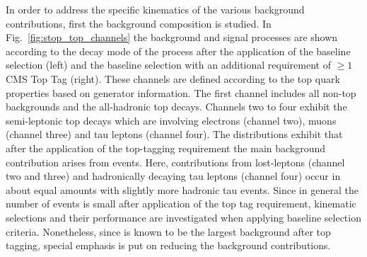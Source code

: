 In order to address the specific kinematics of the various background contributions, first the background composition is studied. In Fig.~\ref{fig:stop_top_channels} the background and signal processes are shown according to the decay mode of the process after the application of the baseline selection (left) and the baseline selection with an additional requirement of $\ge 1$ CMS Top Tag (right). These channels are defined according to the top quark properties based on generator information. The first channel includes all non-top backgrounds and the all-hadronic top decays. Channels two to four exhibit the semi-leptonic top decays which are involving electrons (channel two), muons (channel three) and tau leptons (channel four). The distributions exhibit that after the application of the top-tagging requirement the main background contribution arises from \ttbar events. Here, contributions from lost-leptons (channel two and three) and hadronically decaying tau leptons (channel four) occur in about equal amounts with slightly more hadronic tau events. Since in general the number of events is small after application of the top tag requirement, kinematic selections and their performance are investigated when applying baseline selection criteria. Nonetheless, since \ttbar is known to be the largest background after top tagging, special emphasis is put on reducing the \ttbar background contributions. \\
